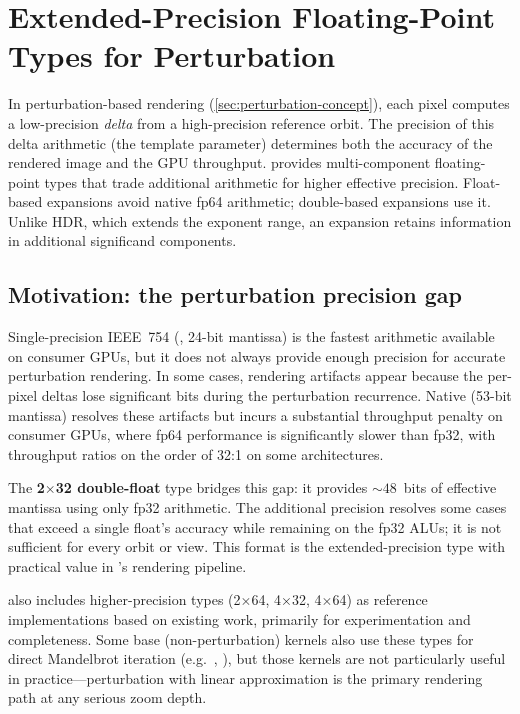 \section{Extended-Precision Floating-Point Types for Perturbation}
\label{sec:extended-precision-types}

In perturbation-based rendering (\cref{sec:perturbation-concept}), each pixel
computes a low-precision \emph{delta} from a high-precision reference orbit.
The precision of this delta arithmetic (the  template parameter)
determines both the accuracy of the rendered image and the GPU throughput.
\FractalShark{} provides multi-component floating-point types that trade
additional arithmetic for higher effective precision. Float-based expansions
avoid native fp64 arithmetic; double-based expansions use it. Unlike HDR, which
extends the exponent range, an expansion retains information in additional
significand components.

\subsection{Motivation: the perturbation precision gap}
\label{subsec:ep-motivation}

Single-precision IEEE~754 (, 24-bit mantissa) is the fastest
arithmetic available on consumer GPUs, but it does not always provide enough
precision for accurate perturbation rendering.  In some cases,
rendering artifacts appear because the per-pixel deltas lose significant bits
during the perturbation recurrence.  Native  (53-bit mantissa)
resolves these artifacts but incurs a substantial throughput penalty on consumer
GPUs, where fp64 performance is significantly slower than fp32, with throughput ratios on the order of 32:1 on some architectures.

The \textbf{2$\times$32 double-float} type bridges this gap: it provides
${\sim}48$~bits of effective mantissa using only fp32 arithmetic. The additional
precision resolves some cases that exceed a single float's accuracy while
remaining on the fp32 ALUs; it is not sufficient for every orbit or view.
This format is the extended-precision type with practical value in
\FractalShark{}'s rendering pipeline.

\FractalShark{} also includes higher-precision types (2$\times$64,
4$\times$32, 4$\times$64) as reference implementations based on existing work,
primarily for experimentation and completeness.  Some base (non-perturbation)
kernels also use these types for direct Mandelbrot iteration (e.g.\
, ), but those kernels are not
particularly useful in practice---perturbation with linear approximation is the
primary rendering path at any serious zoom depth.

